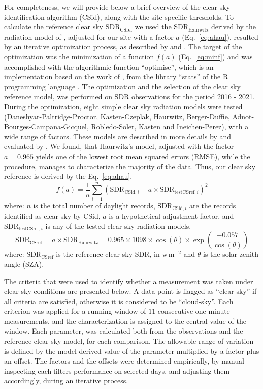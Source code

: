 \documentclass[applsci,article,submit,moreauthors,pdftex]{Definitions/mdpi}
\begin{document}
For completeness, we will provide below a brief overview of the clear
sky identification algorithm (CSid), along with the site specific
thresholds. To calculate the reference clear sky
\(\text{SDR}_\text{CSref}\) we used the \(\text{SDR}_\text{Haurwitz}\)
derived by the radiation model of \citet{Haurwitz1945}, adjusted for our
site with a factor \(a\) (Eq.~\ref{eq:ahau}), resulted by an iterative
optimization process, as described by \citet{Long2000} and
\citet{Reno2016}. The target of the optimization was the minimization of
a function \(f(a)\) (Eq.~\ref{eq:minf}) and was accomplished with the
algorithmic function ``optimise'', which is an implementation based on
the work of \citet{Brent1973}, from the library ``stats'' of the R
programming language \citep{RCT2023}. The optimization and the selection
of the clear sky reference model, was performed on SDR observations for
the period 2016 - 2021. During the optimization, eight simple clear sky
radiation models were tested (Daneshyar-Paltridge-Proctor,
Kasten-Czeplak, Haurwitz, Berger-Duffie, Adnot-Bourges-Campana-Gicquel,
Robledo-Soler, Kasten and Ineichen-Perez), with a wide range of factors.
These models are described in more details by \citet{Reno2012} and
evaluated by \citet{Reno2016}. We found, that Haurwitz's model, adjusted
with the factor \(a = 0.965\) yields one of the lowest root mean squared
errors (RMSE), while the procedure, manages to characterize the majority
of the data. Thus, our clear sky reference is derived by the
Eq.~\ref{eq:ahau}. \begin{equation}
f(a) = \frac{1}{n}\sum_{i=1}^{n} ( \text{SDR}_{\text{CSid},i} - a \times \text{SDR}_{\text{testCSref},i} )^2 \label{eq:minf}
\end{equation} where: \(n\) is the total number of daylight records,
\(\text{SDR}_{\text{CSid},i}\) are the records identified as clear sky
by CSid, \(a\) is a hypothetical adjustment factor, and
\(\text{SDR}_{\text{testCSref},i}\) is any of the tested clear sky
radiation models. \begin{equation}
\text{SDR}_\text{CSref} = a \times \text{SDR}_\text{Haurwitz} = 0.965 \times 1098 \times \cos(\theta) \times \exp \left( \frac{ - 0.057}{\cos(\theta)} \right) \label{eq:ahau}
\end{equation} where: \(\text{SDR}_\text{CSref}\) is the reference clear
sky SDR, in \(\text{w}\,\text{m}^{-2}\) and \(\theta\) is the solar
zenith angle (SZA).

The criteria that were used to identify whether a measurement was taken
under clear-sky conditions are presented below. A data point is flagged
as ``clear-sky'' if all criteria are satisfied, otherwise it is
considered to be ``cloud-sky''. Each criterion was applied for a running
window of \(11\) consecutive one-minute measurements, and the
characterization is assigned to the central value of the window. Each
parameter, was calculated both from the observations and the reference
clear sky model, for each comparison. The allowable range of variation
is defined by the model-derived value of the parameter multiplied by a
factor plus an offset. The factors and the offsets were determined
empirically, by manual inspecting each filters performance on selected
days, and adjusting them accordingly, during an iterative process.
\end{document}
